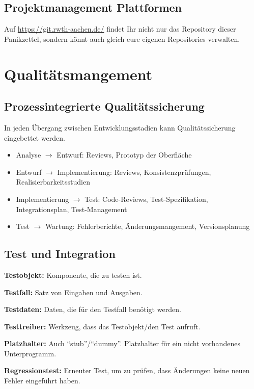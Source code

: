 \documentclass[a4paper,parskip=half*,DIV=7,fontsize=11pt]{scrartcl}
\begin{document}
\subsection{Projektmanagement Plattformen}

Auf \url{https://git.rwth-aachen.de/} findet Ihr nicht nur das Repository dieser Panikzettel, sondern könnt auch gleich eure eigenen Repositories verwalten.

\section{Qualitätsmangement}

\subsection{Prozessintegrierte Qualitätssicherung}

In jeden Übergang zwischen Entwicklungsstadien kann Qualitätssicherung eingebettet werden.

\begin{itemize}
\item Analyse $\to$ Entwurf: Reviews, Prototyp der Oberfläche
\item Entwurf $\to$ Implementierung: Reviews, Konsistenzprüfungen, Realisierbarkeitsstudien
\item Implementierung $\to$ Test: Code-Reviews, Test-Spezifikation, Integrationsplan, Test-Management
\item Test $\to$ Wartung: Fehlerberichte, Änderungsmangement, Versionsplanung
\end{itemize}


\subsection{Test und Integration}

\textbf{Testobjekt:} Komponente, die zu testen ist.

\textbf{Testfall:} Satz von Eingaben und Ausgaben.

\textbf{Testdaten:} Daten, die für den Testfall benötigt werden.

\textbf{Testtreiber:} Werkzeug, dass das Testobjekt/den Test aufruft.

\textbf{Platzhalter:} Auch ``stub''/``dummy''. Platzhalter für ein nicht vorhandenes Unterprogramm.

\textbf{Regressionstest:} Erneuter Test, um zu prüfen, dass Änderungen keine neuen Fehler eingeführt haben.
\end{document}
